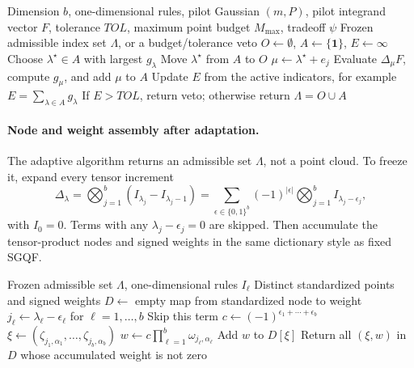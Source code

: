 \begin{algorithm}
\caption{SelectAdaptiveSparseGrid}
\label{alg:bf-hd-select-asghf}
\begin{algorithmic}[1]
\Require Dimension \(b\), one-dimensional rules, pilot Gaussian
\((m,P)\), pilot integrand vector \(F\), tolerance \(TOL\), maximum point budget
\(M_{\max}\), tradeoff \(\psi\)
\Ensure Frozen admissible index set \(\Lambda\), or a budget/tolerance veto
\State \(O\gets\emptyset\), \(A\gets\{\mathbf 1\}\), \(E\gets\infty\)
  \State Choose \(\lambda^\star\in A\) with largest \(g_\lambda\)
  \State Move \(\lambda^\star\) from \(A\) to \(O\)
    \State \(\mu\gets\lambda^\star+e_j\)
      \State Evaluate \(\Delta_\mu F\), compute \(g_\mu\), and add \(\mu\) to \(A\)
    \EndIf
  \EndFor
  \State Update \(E\) from the active indicators, for example
  \(E=\sum_{\lambda\in A}g_\lambda\)
\EndWhile
\State If \(E>TOL\), return veto; otherwise return \(\Lambda=O\cup A\)
\end{algorithmic}
\end{algorithm}

\paragraph{Node and weight assembly after adaptation.}
The adaptive algorithm returns an admissible set \(\Lambda\), not a point cloud.
To freeze it, expand every tensor increment
\[
  \Delta_\lambda
  =
  \bigotimes_{j=1}^b (I_{\lambda_j}-I_{\lambda_j-1})
  =
  \sum_{\epsilon\in\{0,1\}^b}
  (-1)^{|\epsilon|}
  \bigotimes_{j=1}^b I_{\lambda_j-\epsilon_j},
  \label{eq:bf-hd-asghf-increment-expansion}
\]
with \(I_0=0\).  Terms with any \(\lambda_j-\epsilon_j=0\) are skipped.  Then
accumulate the tensor-product nodes and signed weights in the same dictionary
style as fixed SGQF.

\begin{algorithm}
\caption{AssembleFrozenAdaptiveSparseGrid}
\label{alg:bf-hd-assemble-frozen-asghf}
\begin{algorithmic}[1]
\Require Frozen admissible set \(\Lambda\), one-dimensional rules \(I_\ell\)
\Ensure Distinct standardized points and signed weights
\State \(D\gets\) empty map from standardized node to weight
\ForAll{\(\lambda\in\Lambda\)}
    \State \(j_\ell\gets\lambda_\ell-\epsilon_\ell\) for
    \(\ell=1,\ldots,b\)
      \State Skip this term
    \Else
      \State \(c\gets(-1)^{\epsilon_1+\cdots+\epsilon_b}\)
        \State \(\xi\gets(\zeta_{j_1,\alpha_1},\ldots,\zeta_{j_b,\alpha_b})\)
        \State \(w\gets c\prod_{\ell=1}^b\omega_{j_\ell,\alpha_\ell}\)
        \State Add \(w\) to \(D[\xi]\)
      \EndFor
    \EndIf
  \EndFor
\EndFor
\State Return all \((\xi,w)\) in \(D\) whose accumulated weight is not zero
\end{algorithmic}
\end{algorithm}

